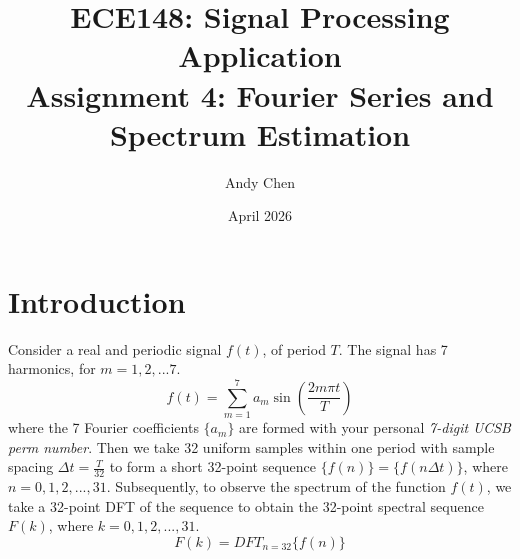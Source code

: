 \documentclass{article}
\title{ECE148: Signal Processing Application \\
    \large Assignment 4: Fourier Series and Spectrum Estimation}
\author{Andy Chen}
\date{April 2026}
\begin{document}
\maketitle

\section{Introduction}
Consider a real and periodic signal \(f(t)\), of period \(T\). The signal has 7 harmonics, for \(m = 1, 2, ...7\).
\[
f(t) = \sum_{m=1}^{7} a_m \sin(\frac{2m\pi t}{T})
\]
where the 7 Fourier coefficients \( \{a_m\}\) are formed with your personal \textit{7-digit UCSB perm number}.
Then we take 32 uniform samples within one period with sample spacing \(\Delta t = \frac{T}{32}\) to form a short 32-point sequence \(\{f(n)\} = \{f(n\Delta t)\}\), where \(n=0, 1, 2, ..., 31\).
Subsequently, to observe the spectrum of the function \(f(t)\), we take a 32-point DFT of the sequence to obtain the 32-point spectral sequence \(F(k)\), where \(k = 0, 1, 2, ..., 31\).
\[
F(k) = DFT_{n=32} \{f(n)\}
\]
\end{document}
